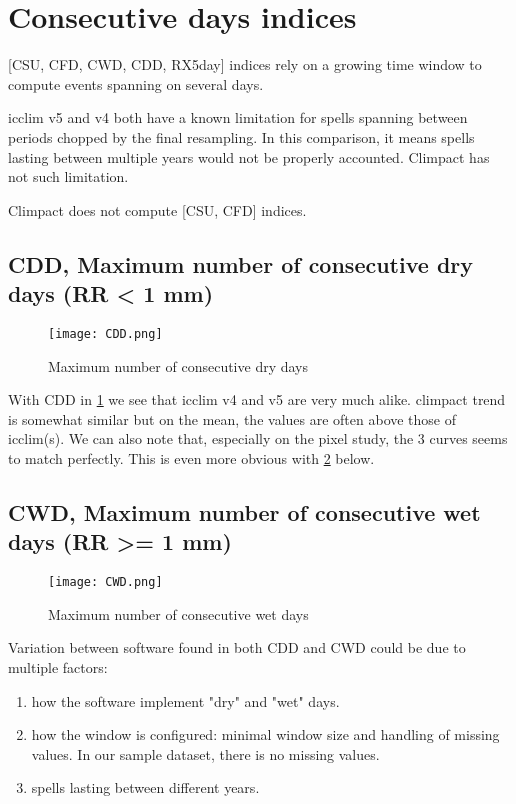\documentclass[a4paper,11pt]{article}
\begin{document}
    \section{Consecutive days indices} \label{section/consecutive_days}
        [CSU, CFD, CWD, CDD, RX5day] indices rely on a growing time window to compute events spanning on several days.

        icclim v5 and v4 both have a known limitation for spells spanning between periods chopped by the final resampling. 
        In this comparison, it means spells lasting between multiple years would not be properly accounted.
        Climpact has not such limitation.

        Climpact does not compute [CSU, CFD] indices.

        \subsection{CDD, Maximum number of consecutive dry days (RR < 1 mm)}
            \begin{figure}[!hbt]
                \centering
                \texttt{[image: CDD.png]}
                \caption{Maximum number of consecutive dry days}
                \label{figure/cdd}
            \end{figure}
            With CDD in \ref{figure/cdd} we see that icclim v4 and v5 are very much alike.
            climpact trend is somewhat similar but on the mean, the values are often above those of icclim(s).
            We can also note that, especially on the pixel study, the 3 curves seems to match perfectly.
            This is even more obvious with \ref{figure/cwd} below.

        \subsection{CWD, Maximum number of consecutive wet days (RR >= 1 mm)}
            \begin{figure}[!hbt]
                \centering
                \texttt{[image: CWD.png]}
                \caption{Maximum number of consecutive wet days}
                \label{figure/cwd}
            \end{figure}

        Variation between software found in both CDD and CWD could be due to multiple factors:
        \begin{enumerate}
            \item how the software implement "dry" and "wet" days.
            \item how the window is configured: minimal window size and handling of missing values. In our sample dataset, there is no missing values.
            \item spells lasting between different years.
        \end{enumerate}
\end{document}
